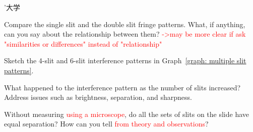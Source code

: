 ’大学\documentclass[addpoints]{physlabs}
\begin{document}
\begin{postlab}
    \filbreak
    \question[2] Compare the single slit and the double slit fringe patterns. What, if anything, can you say about the relationship between them?
    \textcolor{red}{->may be more clear if ask "similarities or differences" instead of "relationship"}
    \begin{solution}[2.5cm]
    \end{solution}


    \newpage

    \filbreak
    \question[2] Sketch the 4-slit and 6-slit interference patterns in Graph~\ref{graph: multiple slit patterns}.

    \begin{center}
    \captionsetup{font=normalsize}
    \end{center}

    \filbreak
    \question[1] What happened to the interference pattern as the number of slits increased? Address issues such as brightness, separation, and sharpness.
    \begin{solution}[2.5cm]
        
    \end{solution}

    \filbreak
    \question[1] Without measuring
    \textcolor{red}{using a microscope}, do all the sets of slits on the slide have equal separation? How can you tell \textcolor{red}{from theory and observations}?
    \begin{solution}[2.5cm]
        

\end{solution}
\end{postlab}
\end{document}
